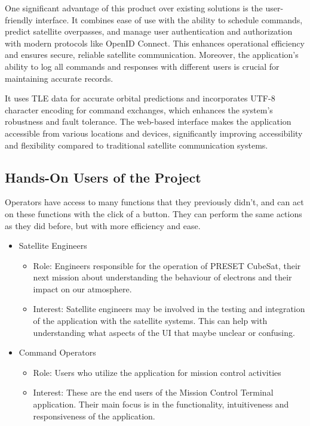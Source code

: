 \documentclass[12pt]{article}
\begin{document}
One significant advantage of this product over existing solutions is the user-friendly interface. It combines ease of use with the ability to schedule commands, predict satellite overpasses, and manage user authentication and authorization with modern protocols like OpenID Connect. This enhances operational efficiency and ensures secure, reliable satellite communication. Moreover, the application’s ability to log all commands and responses with different users is crucial for maintaining accurate records. 

It uses TLE data for accurate orbital predictions and incorporates UTF-8 character encoding for command exchanges, which enhances the system's robustness and fault tolerance. The web-based interface makes the application accessible from various locations and devices, significantly improving accessibility and flexibility compared to traditional satellite communication systems.


\subsection{Hands-On Users of the Project}
Operators have access to many functions that they previously didn't, and can act on these functions with the click of a button. They can perform the same actions as they did before, but with more efficiency and ease. 

\begin{itemize}
    \item Satellite Engineers
    \begin{itemize}
        \item Role: Engineers responsible for the operation of PRESET CubeSat, their next mission about understanding the behaviour of electrons and their impact on our atmosphere. 

        \item Interest: Satellite engineers may be involved in the testing and integration of the application with the satellite systems. This can help with understanding what aspects of the UI that maybe unclear or confusing.  

    \end{itemize}
    \item Command Operators
    \begin{itemize}
        \item Role: Users who utilize the application for mission control activities
        \item Interest: These are the end users of the Mission Control Terminal application. Their main focus is in the functionality, intuitiveness and responsiveness of the application.

    \end{itemize}
\end{itemize}
\end{document}
